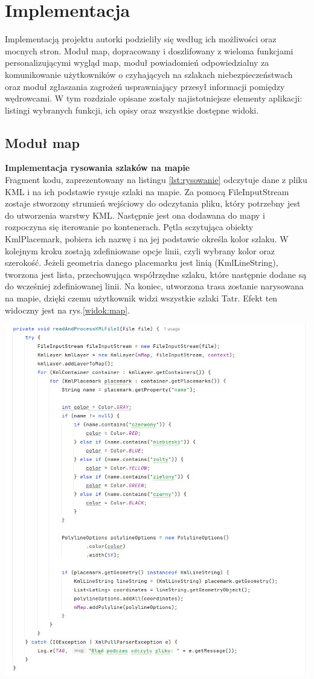 \section{Implementacja}
Implementacją projektu autorki podzieliły się według ich możliwości oraz mocnych stron. Moduł map, dopracowany i doszlifowany z wieloma funkcjami personalizującymi wygląd map, moduł powiadomień odpowiedzialny za komunikowanie użytkowników o czyhających na szlakach niebezpieczeństwach oraz moduł zgłaszania zagrożeń usprawniający przesył informacji pomiędzy wędrowcami.
W tym rozdziale opisane zostały najistotniejsze elementy aplikacji: listingi wybranych funkcji, ich opisy oraz wszystkie dostępne widoki. 

\subsection{Moduł map}
\textbf{Implementacja rysowania szlaków na mapie} \\
Fragment kodu, zaprezentowany na listingu \ref{lst:rysowanie} odczytuje dane z pliku KML i na ich podstawie rysuje szlaki na mapie. Za pomocą FileInputStream zostaje stworzony strumień wejściowy do odczytania pliku, który potrzebny jest do utworzenia warstwy KML. Następnie jest ona dodawana do mapy i rozpoczyna się iterowanie po kontenerach. Pętla sczytująca obiekty KmlPlacemark, pobiera ich nazwę i na jej podstawie określa kolor szlaku. W kolejnym kroku zostają zdefiniowane opcje linii, czyli wybrany kolor oraz szerokość. Jeżeli geometria danego placemarku jest linią (KmlLineString), tworzona jest lista, przechowująca współrzędne szlaku, które następnie dodane są do wcześniej zdefiniowanej linii. Na koniec, utworzona trasa zostanie narysowana na mapie, dzięki czemu użytkownik widzi wszystkie szlaki Tatr. Efekt ten widoczny jest na rys.\ref{widok:map}.\\
\noindent
\begin{minipage}{\linewidth}
    \label{lst:rysowanie}
    \centering
    \includegraphics[width=0.8\linewidth]{img/kod/rysowanie-szlakow.png}
\end{minipage}
